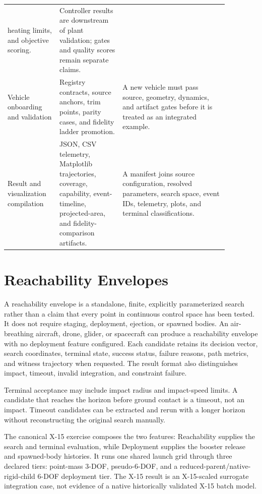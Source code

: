 \begin{longtable}{p{0.20\linewidth}p{0.25\linewidth}p{0.42\linewidth}}
  heating limits, and objective scoring. &
  Controller results are downstream of plant validation; gates and quality
  scores remain separate claims.\\
Vehicle onboarding and validation &
  Registry contracts, source anchors, trim points, parity cases, and fidelity
  ladder promotion. &
  A new vehicle must pass source, geometry, dynamics, and artifact gates before
  it is treated as an integrated example.\\
Result and visualization compilation &
  JSON, CSV telemetry, Matplotlib trajectories, coverage, capability,
  event-timeline, projected-area, and fidelity-comparison artifacts. &
  A manifest joins source configuration, resolved parameters, search space,
  event IDs, telemetry, plots, and terminal classifications.\\
\bottomrule
\end{longtable}

\section{Reachability Envelopes}\label{sec:compiled-reachability}

A reachability envelope is a standalone, finite, explicitly parameterized search
rather than a claim that every point in continuous control space has been tested.
It does not require staging, deployment, ejection, or spawned bodies. An
air-breathing aircraft, drone, glider, or spacecraft can produce a reachability
envelope with no deployment feature configured. Each
candidate retains its decision vector, search coordinates, terminal state,
success status, failure reasons, path metrics, and witness trajectory when
requested. The result format also distinguishes impact, timeout, invalid
integration, and constraint failure.

Terminal acceptance may include impact radius and impact-speed limits. A
candidate that reaches the horizon before ground contact is a timeout, not an
impact. Timeout candidates can be extracted and rerun with a longer horizon
without reconstructing the original search manually.

The canonical X-15 exercise composes the two features: Reachability supplies
the search and terminal evaluation, while Deployment supplies the booster
release and spawned-body histories. It runs one shared launch grid through
three declared tiers: point-mass 3-DOF, pseudo-6-DOF, and a
reduced-parent/native-rigid-child 6-DOF deployment tier. The X-15 result is an
X-15-scaled surrogate integration case, not evidence of a native historically
validated X-15 batch model.

